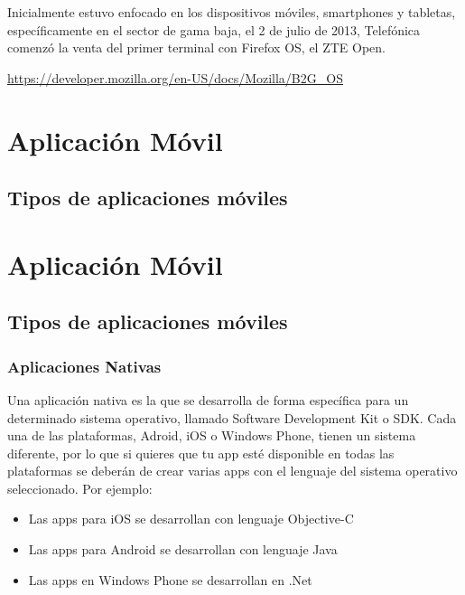Inicialmente estuvo enfocado en los dispositivos móviles, smartphones y tabletas, específicamente en el sector de gama baja, el 2 de julio de 2013, Telefónica comenzó la venta del primer terminal con Firefox OS, el ZTE Open.

\url{https://developer.mozilla.org/en-US/docs/Mozilla/B2G_OS}




\section{Aplicación Móvil}	

\subsection{Tipos de aplicaciones móviles}

\section{Aplicación Móvil}	

\subsection{Tipos de aplicaciones móviles}

\subsubsection{Aplicaciones Nativas}
Una aplicación nativa es la que se desarrolla de forma específica para un determinado  sistema operativo, llamado Software Development Kit o SDK. Cada una de las plataformas, Adroid, iOS o Windows Phone, tienen un sistema diferente, por lo que si quieres que tu app esté disponible en todas las plataformas se deberán de crear varias apps con el lenguaje del sistema operativo seleccionado.
Por ejemplo:
\begin{itemize}

	\item Las apps para iOS se desarrollan con lenguaje Objective-C
	
	\item Las apps para Android se desarrollan con lenguaje Java
	
	\item Las apps en Windows Phone se desarrollan en .Net

	
\end{itemize}
    
